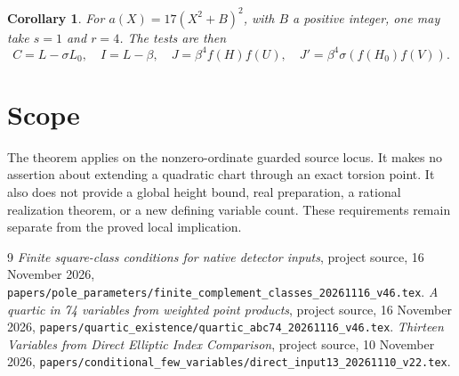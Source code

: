 \documentclass[11pt,a4paper]{article}
\newtheorem{corollary}[theorem]{Corollary}
\begin{document}
\begin{corollary}
For $a(X)=17(X^2+B)^2$, with $B$ a positive integer, one may take
$s=1$ and $r=4$. The tests are then
\[
 C=L-\sigma L_0,\quad I=L-\beta,\quad
 J=\beta^4f(H)f(U),\quad
 J'=\beta^4\sigma(f(H_0)f(V)).
\]
\end{corollary}

\section{Scope}

The theorem applies on the nonzero-ordinate guarded source locus.
It makes no assertion about extending a quadratic chart through an
exact torsion point. It also does not provide a global height bound,
real preparation, a rational realization theorem, or a new defining
variable count. These requirements remain separate from the proved
local implication.

\begin{thebibliography}{9}
\emph{Finite square-class conditions for native detector inputs},
project source, 16 November 2026,
\nolinkurl{papers/pole_parameters/finite_complement_classes_20261116_v46.tex}.
\emph{A quartic in 74 variables from weighted point products},
project source, 16 November 2026,
\nolinkurl{papers/quartic_existence/quartic_abc74_20261116_v46.tex}.
\emph{Thirteen Variables from Direct Elliptic Index Comparison},
project source, 10 November 2026,
\nolinkurl{papers/conditional_few_variables/direct_input13_20261110_v22.tex}.
\end{thebibliography}
\end{document}
